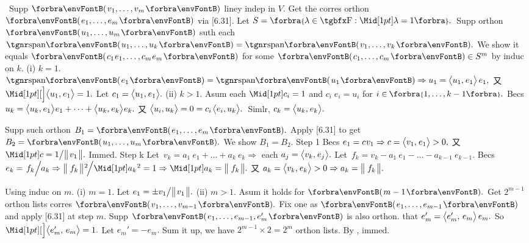 \BulletPointX\Tips \,\,\,Supp $\Par{v_1,\dots,v_m}$ liney indep in $V.$ Get the corres orthon $\Par{e_1,\dots,e_m}$ via [6.31].\TextB{}
{\IndentTips}Let $S=\Bra{\lambda\in\Fbb:\aMid{\lambda}=1}.$ \,Supp orthon $\Par{u_1,\dots,u_m}$ suth each $\Span{u_1,\dots,u_k}=\Span{v_1,\dots,v_k}.$\vspace{1pt}\TextB{}
{\IndentTips}We show it equals $\Par{c_1\:\!e_1,\dots,c_m\:\!e_m}$ for some $\Par{c_1,\dots,c_m}\in S^m$ by induc on $k.$\vspace{1pt}\TextB{}
{\IndentTips}(i) $k=1.$ $\Span{e_1}=\Span{u_1}\Rightarrow u_1=\Ang{u_1,\:\!e_1}\,e_1,$ 又 $\innerA{u_1,\:\!e_1}=1.$ Let $c_1=\big\langle{}u_1,\:\!e_1{}\big\rangle.$\vspace{1pt}\TextB{}
{\IndentTips}(ii) $k>1.$ Asum each $\aMid{c_i}=1$ and $c_i\;\!e_i=u_i$ for $i\in\;\!\!\Bra{1,\dots,k-1}.$\vspace{1pt}\TextB{}
{\IndentTips\Hii}Becs $u_k=\big\langle{}u_k,\:\!e_1{}\big\rangle\:\!e_1+\dots+\big\langle{}u_k,\:\!e_k{}\big\rangle\:\!e_k.$ 又 $\big\langle{}u_i,u_k{}\big\rangle=0=c_i\;\!\big\langle{}e_i,u_k{}\big\rangle.$ \,Simlr, $c_k=\big\langle{}u_k,\:\!e_k{}\big\rangle.$\PfEnd
\SepLine

Supp such orthon $B_1=\Par{e_1,\dots,e_m}.$ Apply [6.31] to get $B_2=\Par{u_1,\dots,u_m}.$ We show $B_1=B_2.$\parSol{}
{\tgbf Step 1}\;\; Becs $e_1=c\:\!v_1\Rightarrow c=\big\langle{}v_1,\:\!e_1{}\big\rangle>0,$ 又 $\aMid{c}=1\big/\Dvert{v_1}.$ Immed.\parSol{}
{\tgbf Step k}\;\: Let \,$v_k=a_1\:\!e_1+\dots+a_k\:\!e_k\Rightarrow$ each $a_j=\big\langle{}v_k,\:\!e_j{}\big\rangle.$ Let \,$f_k=v_k-a_1\:\!e_1-\dots-a_{k-1}\:\!e_{k-1}.$\vspace{1pt}\parSol{}
Becs $e_k=\;\!f_k\Big/\;\!\!a_k\Rightarrow\Dvertsq{\,f_k}\!\Big/\aMidsq{a_k}=1\Rightarrow\aMid{a_k}=\Dvert{\,f_k}.$ 又 $a_k=\big\langle{}v_k,\:\!e_k{}\big\rangle>0\Rightarrow a_k=\big\Vert\hspace{1pt}{}\,f_k{}\hspace{1pt}\big\Vert.$\PfEnd
\SepLine

Using induc on $m.$ (i) $m=1.$ Let $e_1=\pm v_1\big/\big\Vert\hspace{1pt}{}v_1{}\hspace{1pt}\big\Vert.$ (ii) $m>1.$ Asum it holds for $\Par{m-1}.$\vspace{1pt}\parSol{}
Get $2^{m-1}$ orthon lists corres $\Par{v_1,\dots,v_{m-1}}.$ Fix one as $\Par{e_1,\dots,e_{m-1}}$ and apply [6.31] at step $m.$\vspace{2pt}\parSol{}
Supp $\Par{e_1,\dots,e_{m-1},e_m'}$ is also orthon. \NOTICE that $e_m'=\big\langle{}e_m',\,e_m{}\big\rangle\,e_m.$ \;So $\innerA{e_m',\,e_m}=1.$\vspace{2pt}\parSol{}
Let $e_m'=-e_m.$ Sum it up, we have $2^{m-1}\times 2=2^m$ orthon lists. \qquad\Or By \TIPS, immed.\PfEnd
\SepLine

